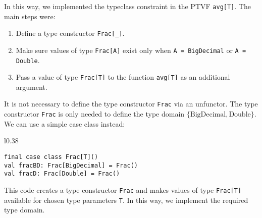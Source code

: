 In this way, we implemented the typeclass constraint in the PTVF \lstinline!avg[T]!.
The main steps were:
\begin{enumerate}
\item Define a type constructor \lstinline!Frac[_]!.
\item Make sure values of type \lstinline!Frac[A]! exist only when \lstinline!A = BigDecimal!
or \lstinline!A = Double!.
\item Pass a value of type \lstinline!Frac[T]! to the function \lstinline!avg[T]!
as an additional argument.
\end{enumerate}
It is not necessary to define the type constructor \lstinline!Frac!
via an unfunctor. The type constructor \lstinline!Frac! is only needed
to define the type domain $\{\text{BigDecimal},\text{Double}\}$.
We can use a simple case class instead:

\begin{wrapfigure}{l}{0.38\columnwidth}%
\vspace{-1.1\baselineskip}
\begin{lstlisting}
final case class Frac[T]()
val fracBD: Frac[BigDecimal] = Frac()
val fracD: Frac[Double] = Frac()
\end{lstlisting}

\vspace{-1.1\baselineskip}
\end{wrapfigure}%

\noindent This code creates a type constructor \lstinline!Frac! and
makes values of type \lstinline!Frac[T]! available for chosen type
parameters \lstinline!T!. In this way, we implement the required
type domain.

